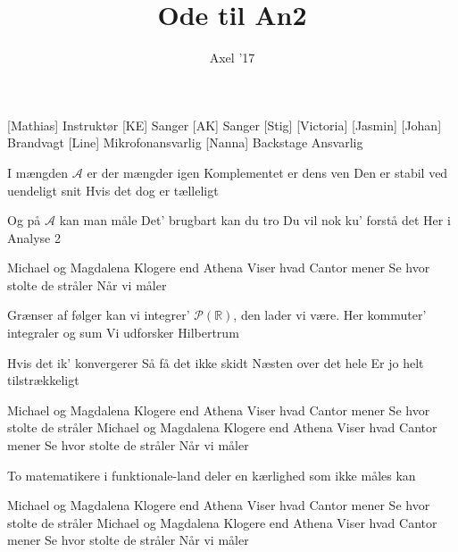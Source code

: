 \documentclass[a4paper,11pt]{article}
\title{Ode til An2}
\author{Axel '17}
\begin{document}
\maketitle

\begin{roles}
[Mathias] Instruktør
[KE] Sanger
[AK] Sanger
[Stig]
[Victoria]
[Jasmin]
[Johan] Brandvagt
[Line] Mikrofonansvarlig
[Nanna] Backstage Ansvarlig
\end{roles}

\begin{song}
 I mængden $\mathcal{A}$ er der mængder igen
Komplementet er dens ven
Den er stabil ved uendeligt snit
Hvis det dog er tælleligt

 Og på $\mathcal{A}$ kan man måle
Det' brugbart kan du tro
Du vil nok ku' forstå det
Her i Analyse 2

 Michael og Magdalena
Klogere end Athena
Viser hvad Cantor mener
Se hvor stolte de stråler
Når vi måler

 Grænser af følger kan vi integrer'
$\mathcal{P}(\mathbb{R})$, den lader vi være.
Her kommuter' integraler og sum
Vi udforsker Hilbertrum

 Hvis det ik' konvergerer
Så få det ikke skidt
Næsten over det hele
Er jo helt tilstrækkeligt

 Michael og Magdalena
Klogere end Athena
Viser hvad Cantor mener
Se hvor stolte de stråler
Michael og Magdalena
Klogere end Athena
Viser hvad Cantor mener
Se hvor stolte de stråler
Når vi måler

 To matematikere i funktionale-land
deler en kærlighed som ikke måles kan


 Michael og Magdalena
Klogere end Athena
Viser hvad Cantor mener
Se hvor stolte de stråler
Michael og Magdalena
Klogere end Athena
Viser hvad Cantor mener
Se hvor stolte de stråler
Når vi måler
\end{song}
\end{document}
